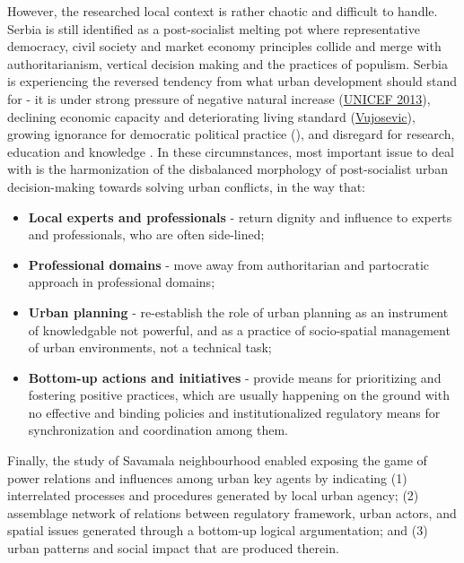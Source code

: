 \documentclass[11pt]{report}
\begin{document}
{{{However, the researched local context is rather chaotic and difficult to handle.
Serbia is still identified as a post-socialist melting pot where representative democracy, civil society and market economy principles collide and merge with authoritarianism, vertical decision making and the practices of populism.
Serbia is experiencing the reversed tendency from what urban development should stand for - it is under strong pressure of negative natural increase (\href{ref}{UNICEF 2013}), declining economic capacity and deteriorating living standard (\href{ref}{Vujosevic}), growing ignorance for democratic political practice (\href{ref}{\citealt{peric_evolution_2016}}), and disregard for research, education and  knowledge \href{ref}{\citealt{vujosevic_conundrum_2012}}.
In these circumnstances, most important issue to deal with is the harmonization of the disbalanced morphology of post-socialist urban decision-making towards solving urban conflicts, in the way that:

\begin{itemize}
\item \textbf{Local experts and professionals} - return dignity and influence to experts and professionals, who are often side-lined;

\item \textbf{Professional domains} - move away from authoritarian and partocratic approach in professional domains;

\item \textbf{Urban planning} - re-establish the role of urban planning as an instrument of knowledgable not powerful, and as a practice of socio-spatial management of urban environments, not a technical task;

\item \textbf{Bottom-up actions and initiatives}  - provide means for prioritizing and fostering positive practices, which are usually happening on the ground with no effective  and  binding policies  and institutionalized  regulatory  means  for synchronization  and  coordination  among  them.
\end{itemize}

Finally, the study of Savamala neighbourhood enabled exposing the game of power relations and influences among urban key agents by indicating
(1)	interrelated processes and procedures generated by local urban agency;
(2)	assemblage network of relations between regulatory framework, urban actors,  and spatial issues generated through a bottom-up logical argumentation;
and
(3)	urban  patterns  and  social  impact that are produced therein.  
\\

}}}
\end{document}
